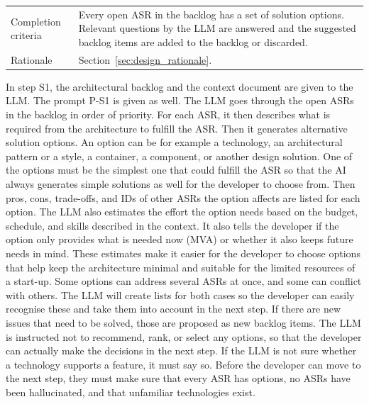 \begin{table}[!htb]
\begin{tabularx}{\textwidth}{l X}
		Completion criteria & Every open ASR in the backlog has a set of solution options. Relevant questions by the LLM are answered and the suggested backlog items are added to the backlog or discarded.                                                                                                                      \\
		Rationale           & Section~\ref{sec:design_rationale}.                                                                                     \\
		\bottomrule
	\end{tabularx}
\end{table}

In step S1, the architectural backlog and the context document are given to the LLM. The prompt P-S1 is given as well. The LLM goes through the open ASRs in the backlog in order of priority. For each ASR, it then describes what is required from the architecture to fulfill the ASR. Then it generates alternative solution options. An option can be for example a technology, an architectural pattern or a style, a container, a component, or another design solution. One of the options must be the simplest one that could fulfill the ASR so that the AI always generates simple solutions as well for the developer to choose from. Then pros, cons, trade-offs, and IDs of other ASRs the option affects are listed for each option. The LLM also estimates the effort the option needs based on the budget, schedule, and skills described in the context. It also tells the developer if the option only provides what is needed now (MVA) or whether it also keeps future needs in mind. These estimates make it easier for the developer to choose options that help keep the architecture minimal and suitable for the limited resources of a start-up. Some options can address several ASRs at once, and some can conflict with others. The LLM will create lists for both cases so the developer can easily recognise these and take them into account in the next step. If there are new issues that need to be solved, those are proposed as new backlog items. The LLM is instructed not to recommend, rank, or select any options, so that the developer can actually make the decisions in the next step. If the LLM is not sure whether a technology supports a feature, it must say so. Before the developer can move to the next step, they must make sure that every ASR has options, no ASRs have been hallucinated, and that unfamiliar technologies exist.


